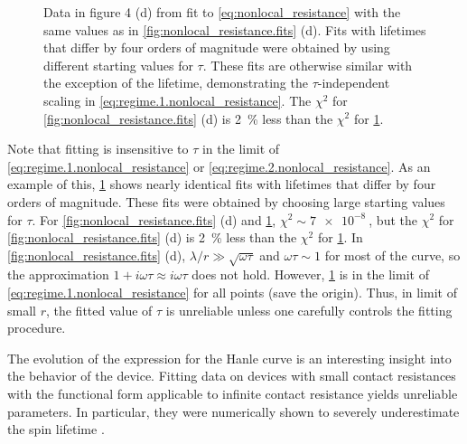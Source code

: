 \begin{figure}
  \caption{%
    Data in figure 4 (d) from \cite{PhysRevLett.105.167202}
    fit to \cref{eq:nonlocal_resistance}
    with the same values as in
    \cref{fig:nonlocal_resistance.fits} (d).
    Fits with lifetimes that differ by four orders of magnitude
    were obtained by using different starting values for $τ$.
    These fits are otherwise similar with the exception of the lifetime,
    demonstrating the $τ$-independent scaling in
    \cref{eq:regime.1.nonlocal_resistance}.
    The $χ^2$ for \cref{fig:nonlocal_resistance.fits} (d)
    is \SI{2}{\percent} less than the $χ^2$ for
    \cref{fig:nonlocal_resistance.large_lifetime}.
  }\label{fig:nonlocal_resistance.large_lifetime}
\end{figure}

Note that fitting is insensitive to $τ$ in the limit of
\cref{eq:regime.1.nonlocal_resistance}
or \cref{eq:regime.2.nonlocal_resistance}.
As an example of this,
\cref{fig:nonlocal_resistance.large_lifetime} shows nearly identical fits
with lifetimes that differ by four orders of magnitude.
These fits were obtained by choosing large starting values for $τ$.
For \cref{fig:nonlocal_resistance.fits} (d)
and \cref{fig:nonlocal_resistance.large_lifetime},
$χ^2 ∼ \SI{7e-8}{}$, but the $χ^2$ for
\cref{fig:nonlocal_resistance.fits} (d)
is \SI{2}{\percent} less than the $χ^2$ for
\cref{fig:nonlocal_resistance.large_lifetime}.
In \cref{fig:nonlocal_resistance.fits} (d),
$λ / r ≫ \sqrt{ω τ}$ and $ω τ ∼ 1$ for most of the curve,
so the approximation $1 + i ω τ ≈ i ω τ$ does not hold.
However, \cref{fig:nonlocal_resistance.large_lifetime}
is in the limit of \cref{eq:regime.1.nonlocal_resistance}
for all points (save the origin).
Thus, in limit of small $r$, the fitted value of $τ$ is unreliable
unless one carefully controls the fitting procedure.

The evolution of the expression for the Hanle curve
is an interesting insight into the behavior of the device.
Fitting data on devices with small contact resistances
with the functional form applicable to infinite contact resistance
yields unreliable parameters.
In particular, they were numerically shown
to severely underestimate the spin lifetime
\cite{PhysRevB.86.235408}.

